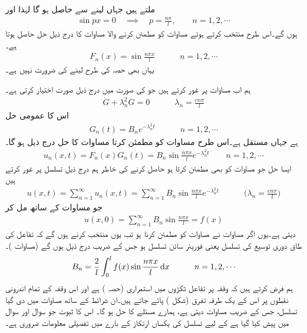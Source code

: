 ملتے ہیں جہاں  لینے سے  حاصل ہو گا لہٰذا  اور 
\begin{align*}
\sin px=0\quad \implies \quad p=\frac{n\pi}{l}, \quad \quad n=1,2,\cdots 
\end{align*}
ہوں گے۔اس طرح  منتخب  کرتے ہوئے مساوات  کو مطمئن کرنے والا مساوات  کا درج ذیل حل  حاصل ہوتا ہے۔
\begin{align*}
F_n(x)=\sin \frac{n\pi x}{l}\quad \quad \quad n=1,2,\cdots
\end{align*}
یہاں بھی حصہ  کی طرح  لینے کی ضرورت نہیں ہے۔

ہم اب مساوات  پر غور کرتے ہیں جو  کی صورت میں درج ذیل صورت اختیار کرتی ہے۔
\begin{align*}
\dot{G}+\lambda_n^2G=0\quad \quad \quad \lambda_n=\frac{cn\pi}{l}
\end{align*}
اس کا عمومی حل
\begin{align*}
G_n(t)=B_ne^{-\lambda_n^2t}\quad \quad \quad n=1,2,\cdots
\end{align*}
ہے جہاں  مستقل ہے۔اس طرح مساوات  کو مطمئن کرتا مساوات  کا حل درج ذیل ہو گا۔
\begin{align}\label{مساوات_جزوی_حل_حرارت_ث}
u_n(x,t)=F_n(x)G_n(t)=B_n\sin\frac{n\pi x}{l}e^{-\lambda_n^2t}\quad \quad n=1,2,\cdots
\end{align}
\quad ایسا حل جو مساوات  کو بھی مطمئن کرتا ہو حاصل کرنے کی خاطر ہم درج ذیل تسلسل پر غور کرتے ہیں
\begin{align}\label{مساوات_جزوی_حل_حرارت_ج}
u(x,t)=\sum_{n=1}^{\infty} u_n(x,t)=\sum_{n=1}^{\infty}B_n\sin\frac{n\pi x}{l}e^{-\lambda_n^2t}\quad \quad\quad \big(\lambda_n=\frac{cn\pi}{l}\big)
\end{align}
جو مساوات  کے  ساتھ مل کر
\begin{align*}
u(x,0)=\sum_{n=1}^{\infty} B_n\sin\frac{n\pi x}{l}=f(x)
\end{align*}
دیتی ہے۔یوں  اگر مساوات  نے مساوات  کو مطمئن کرنا ہو تب  یوں منتخب کرنے ہوں گے کہ  تفاعل  کی طاق دوری توسیع کی تسلسل یعنی فوریئر سائن تسلسل ہو جس کے  ضریب  درج ذیل ہوں گے (مساوات )۔
\begin{align}\label{مساوات_جزوی_حل_حرارت_چ}
B_n=\frac{2}{l}\int_0^l f(x)\sin\frac{n\pi x}{l}\dif x\quad \quad \quad n=1,2,\cdots
\end{align}
ہم فرض کرتے ہیں کہ وقفہ  پر تفاعل  ٹکڑوں میں استمراری (حصہ ) ہے  اور اس وقفہ کے تمام اندرونی نقطوں پر اس کے یک طرفہ تفرق (شکل ) پائے جاتے ہیں۔ان شرائط کے ساتھ مساوات  میں دی گیا تسلسل، جس کے  ضریب  مساوات  دیتی ہے، ہمارے مسئلے کا حل ہو گا۔ اس کا ثبوت جو سوال  اور سوال  میں پیش کیا گیا ہے کے لیے تسلسل کی یکساں ارتکاز کے بارے میں تفصیلی معلومات ضروری ہے۔

